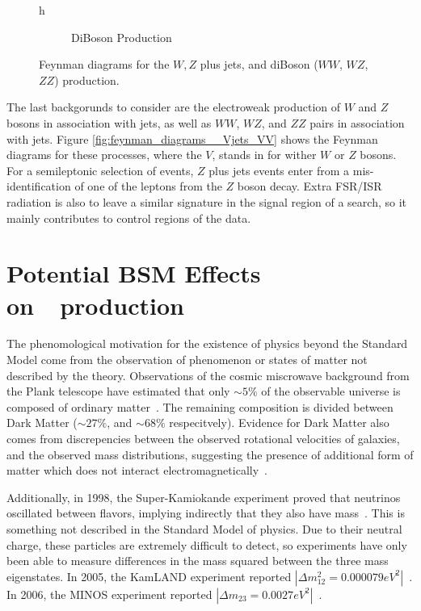 \begin{figure}{h}
\begin{subfigure}[h]{0.3\textwidth}
        \caption{DiBoson Production}\label{fd:VV}
      \end{subfigure}
      \caption{Feynman diagrams for the $W,Z$ plus jets, and diBoson
        ($WW$, $WZ$, $ZZ$) production.} \label{fig:feynman_diagrams__Vjets__VV}
\end{figure}

\par The last backgorunds to consider are the electroweak production
of $W$ and $Z$ bosons in association with jets, as well as $WW$, $WZ$, and
$ZZ$ pairs in association with jets.  Figure
\ref{fig:feynman_diagrams__Vjets_VV} shows the Feynman diagrams for
these processes, where the $V$, stands in for wither $W$ or $Z$
bosons.  For a semileptonic selection of \ttH events, $Z$ plus jets
events enter from a mis-identification of one of the leptons from the
$Z$ boson decay.  Extra FSR/ISR radiation is also to leave a similar
signature in the signal region of a \ttH search, so it mainly
contributes to control regions of the data.  

\section{Potential BSM Effects on~\ttH~production}
\label{bsm_effects_overview}

\par The phenomological motivation for the existence of physics beyond
the Standard Model come from the observation of phenomenon or states
of matter not described by the theory.  Observations of the cosmic miscrowave background
from the Plank telescope have estimated that only $\sim5\%$ of the
observable universe is composed of ordinary
matter~\cite{BSM_Planck}. The remaining composition is divided between  
Dark Matter ($\sim27\%$, and $\sim68\%$ respecitvely).  Evidence for
Dark Matter also comes from discrepencies between the observed
rotational velocities of galaxies, and the observed mass
distributions, suggesting the presence of additional form of matter
which does not interact
electromagnetically~\cite{BSM_Rubin_DM_GalaxyRotations}.

\par Additionally, in 1998, the Super-Kamiokande experiment proved that
neutrinos oscillated between flavors, implying indirectly that they
also have mass~\cite{BSM_superK}.  This is something not described in
the Standard Model of physics.  Due to their neutral charge, these
particles  are extremely difficult to detect, so experiments have only
been able to measure differences in the mass squared between the three
mass eigenstates.  In 2005, the KamLAND experiment reported
$|{\Delta}m^{2}_{12}=0.000079
eV^{2}|$~\cite{BSM_neutrinoDeltaM12_kamland}.  In 2006, the MINOS
experiment reported
$|{\Delta}m_{23}=0.0027 eV^{2}|$~\cite{BSM_neutrinoDeltaM23_minos}.

